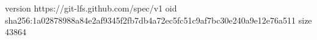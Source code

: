 version https://git-lfs.github.com/spec/v1
oid sha256:1a02878988a84e2af9345f2fb7db4a72ec5fc51c9af7bc30e240a9e12e76a511
size 43864
